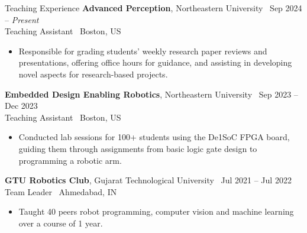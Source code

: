 \documentclass{resume}
\begin{document}
\begin{rSection}{Teaching Experience}
% 
{\bf Advanced Perception}{, Northeastern University} \hfill {\ Sep 2024 -- \textit{Present}}\\
Teaching Assistant \hfill {\ {Boston, US}}
\begin{itemize}
  \item \vspace{-0.5em} Responsible for grading students’ weekly research paper reviews and presentations, offering office hours for guidance, and assisting in developing novel aspects for research-based projects.
 \vspace{-0.3em}
\end{itemize} 
{\bf Embedded Design Enabling Robotics}{, Northeastern University} \hfill {\ Sep 2023 -- Dec 2023}\\
Teaching Assistant \hfill {\ {Boston, US}}
\begin{itemize}
  \item \vspace{-0.5em} Conducted lab sessions for 100+ students using the De1SoC FPGA board, guiding them through assignments from basic logic gate design to programming a robotic arm.
 \vspace{-0.3em}
\end{itemize} 

{\bf GTU Robotics Club}{, Gujarat Technological University} \hfill {\ Jul 2021 -- Jul 2022}\\
Team Leader \hfill {\ {Ahmedabad, IN}}
\begin{itemize}
  \item \vspace{-0.5em} Taught 40 peers robot programming, computer vision and machine learning over a course of 1 year. \vspace{-0.3em}
\end{itemize} 

\end{rSection}

\end{document}
